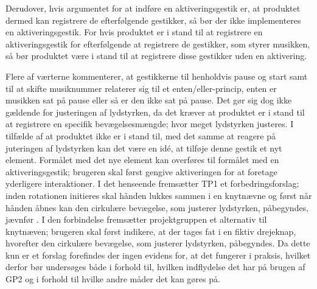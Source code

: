 Derudover, hvis argumentet for at indføre en aktiveringsgestik er, at produktet dermed kan registrere de efterfølgende gestikker, så bør der ikke implementeres en aktiveringsgestik. For hvis produktet er i stand til at registrere en aktiveringsgestik for efterfølgende at registrere de gestikker, som styrer musikken, så bør produktet være i stand til at registrere disse gestikker uden en aktivering. 

Flere af værterne kommenterer, at gestikkerne til henholdvis pause og start samt til at skifte musiknummer relaterer sig til et enten/eller-princip, enten er musikken sat på pause eller så er den ikke sat på pause. Det gør sig dog ikke gældende for justeringen af lydstyrken, da det kræver at produktet er i stand til at registrere en specifik bevægelsesmængde; hvor meget lydstyrken justeres. I tilfælde af at produktet ikke er i stand til, med det samme at reagere på juteringen af lydstyrken kan det være en idé, at tilføje denne gestik et nyt element. Formålet med det nye element kan overføres til formålet med en aktiveringsgestik; brugeren skal først gengive aktiveringen for at foretage yderligere interaktioner. I det henseende fremsætter TP1 et forbedringsforslag; inden rotationen initieres skal hånden lukkes sammen i en knytnævne og først når hånden åbnes kan den cirkulære bevægelse, som justerer lydstyrken, påbegyndes, jævnfør . I den forbindelse fremsætter projektgruppen et alternativ til knytnæven; brugeren skal først indikere, at der tages fat i en fiktiv drejeknap, hvorefter den cirkulære bevægelse, som justerer lydstyrken, påbegyndes. Da dette kun er et forslag forefindes der ingen evidens for, at det fungerer i praksis, hvilket derfor bør undersøges både i forhold til, hvilken indflydelse det har på brugen af GP2 og i forhold til hvilke andre måder det kan gøres på.       


